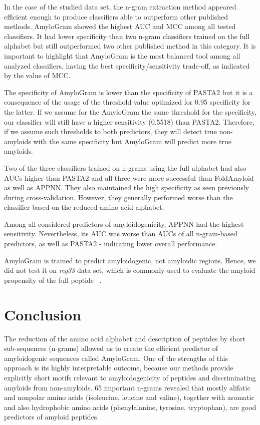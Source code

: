 \documentclass[fleqn,10pt,twoside]{gcb15submission}
\begin{document}
  In the case of the studied data set, the n-gram extraction method appeared 
efficient enough to produce classifiers able to outperform other published 
methods. AmyloGram showed the highest AUC and MCC among all tested classifiers. 
It had lower specificity than two n-gram classifiers trained on the full 
alphabet but still outperformed two other published method in this category. It 
is important to highlight that AmyloGram is the most balanced tool among all analyzed 
classifiers, having the best specificity/sensitivity trade-off, as indicated by 
the value of MCC.
 
  The specificity of AmyloGram is lower than the specificity of PASTA2 but it is 
a consequence of the usage of the threshold value optimized for 0.95 specificity 
for the latter. If we assume for the AmyloGram the same threshold for the 
specificity, our classifier will still have a higher sensitivity (0.5518) than 
PASTA2. Therefore, if we assume such thresholds to both predictors, they will detect true 
non-amyloids with the same specificity but AmyloGram will predict more true amyloids. 

  Two of  the three classifiers trained on  n-grams using  the full alphabet 
%
%
%
%
%
had also AUCs higher than PASTA2 and all three were more successful than 
FoldAmyloid as well as APPNN. They also maintained the high specificity as seen 
previously during cross-validation. However, they generally performed worse than 
the classifier based on the reduced amino acid alphabet.
  
  Among all considered predictors of amyloidogenicity, APPNN had the highest 
sensitivity. Nevertheless, its AUC was worse than AUCs of all n-gram-based 
predictors, as well as PASTA2  - indicating lower overall performance.

  AmyloGram is trained to predict amyloidogenic, not amyloidic regions. Hence, 
we did not test it on \textit{reg33} data set, which is commonly used to 
evaluate the amyloid propensity of the full peptide ~\citep{tsolis_consensus_2013}.

\section{Conclusion}

The reduction of the amino acid alphabet and description of peptides by 
short sub-sequences (n-grams) allowed us to create the efficient predictor 
of amyloidogenic sequences called AmyloGram. One of the strengths of this approach 
is its highly interpretable outcome, because our methods provide explicitly 
short motifs relevant to amyloidogenicity of peptides and discriminating amyloids 
from  non-amyloids. 65 important n-grams revealed that mostly alifatic 
and nonpolar amino acids (isoleucine, leucine and valine), together with aromatic 
and also hydrophobic amino acids (phenylalanine, tyrosine, tryptophan), are good 
predictors of amyloid peptides.
\end{document}
